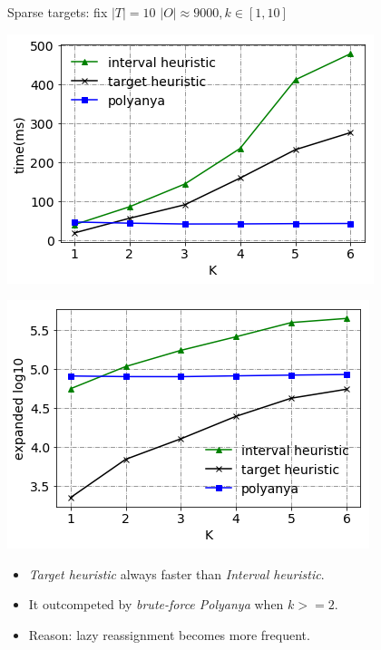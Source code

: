 \begin{frame}{Sparse targets: fix $|T|=10$}
\centering
\small{$|O| \approx 9000, k \in [1, 10]$}
\begin{minipage}{.5\textwidth}
    \begin{adjustbox}{max totalsize={.9\textwidth}{.9\textheight}, right}
    \centering
    \includegraphics{pic/e2_sparse_time.png}
    \end{adjustbox}
\end{minipage}%
\begin{minipage}{.5\textwidth}
    \begin{adjustbox}{max totalsize={.9\textwidth}{.9\textheight}, right}
    \centering
    \includegraphics{pic/e2_sparse_gen.png}
    \end{adjustbox}
\end{minipage}
\begin{itemize}
    \item \small{\textit{Target heuristic} always faster than \textit{Interval heuristic}.}
    \item \small{It outcompeted by \textit{brute-force Polyanya} when $k>=2$.}
    \item \small{Reason: lazy reassignment becomes more frequent.}
\end{itemize}
\end{frame}